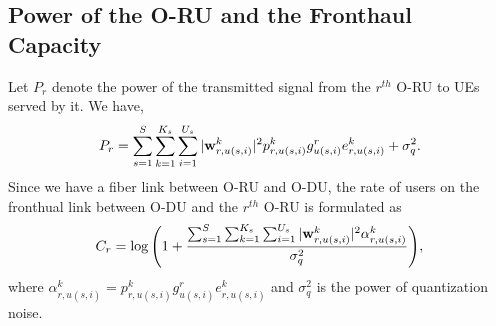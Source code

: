 \documentclass{article}
\begin{document}
\subsection{Power of the O-RU and the Fronthaul Capacity}
Let $P_r$ denote the power of the transmitted signal from the $r^{th}$ O-RU to UEs served by it. We have,
\begin{equation}\label{pr}
P_r = \sum_{s=1}^{S}\sum_{k=1}^{K_s}\sum_{i=1}^{U_s}|\bold{w}_{r,u(s,i)}^{k}|^2 p_{r,u(s,i)}^{k} g_{u(s,i)}^r e^k_{r,u(s,i)}+ \sigma_{q}^2.
\end{equation}
Since we have a fiber link between O-RU and O-DU, the rate of users on the fronthual link between O-DU and the $r^{th}$ O-RU  is formulated as
\begin{equation}\label{cr}
C_{r} = \log{\left(1+ \frac{\sum_{s=1}^{S}\sum_{k=1}^{K_s}\sum_{i=1}^{U_s}|\bold{w}_{r,u(s,i)}^{k}|^2 \mathcal{\alpha}^k_{r,u(s,i)} }{ \sigma_{q}^2}\right)},
\end{equation}
where $\mathcal{\alpha}^k_{r,u(s,i)}= p_{r,u(s,i)}^{k} g_{u(s,i)}^r e^k_{r,u(s,i)}$ and $\sigma_{q}^2$ is the power of quantization noise.
\end{document}
